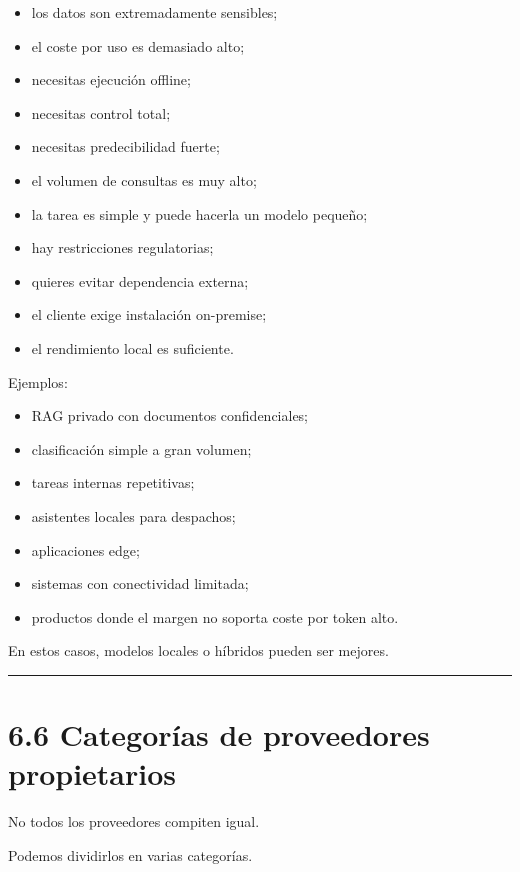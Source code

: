 \begin{itemize}
\tightlist
\item
  los datos son extremadamente sensibles;
\item
  el coste por uso es demasiado alto;
\item
  necesitas ejecución offline;
\item
  necesitas control total;
\item
  necesitas predecibilidad fuerte;
\item
  el volumen de consultas es muy alto;
\item
  la tarea es simple y puede hacerla un modelo pequeño;
\item
  hay restricciones regulatorias;
\item
  quieres evitar dependencia externa;
\item
  el cliente exige instalación on-premise;
\item
  el rendimiento local es suficiente.
\end{itemize}

Ejemplos:

\begin{itemize}
\tightlist
\item
  RAG privado con documentos confidenciales;
\item
  clasificación simple a gran volumen;
\item
  tareas internas repetitivas;
\item
  asistentes locales para despachos;
\item
  aplicaciones edge;
\item
  sistemas con conectividad limitada;
\item
  productos donde el margen no soporta coste por token alto.
\end{itemize}

En estos casos, modelos locales o híbridos pueden ser mejores.

\begin{center}\rule{0.5\linewidth}{0.5pt}\end{center}

\section{6.6 Categorías de proveedores
propietarios}\label{categoruxedas-de-proveedores-propietarios}

No todos los proveedores compiten igual.

Podemos dividirlos en varias categorías.

